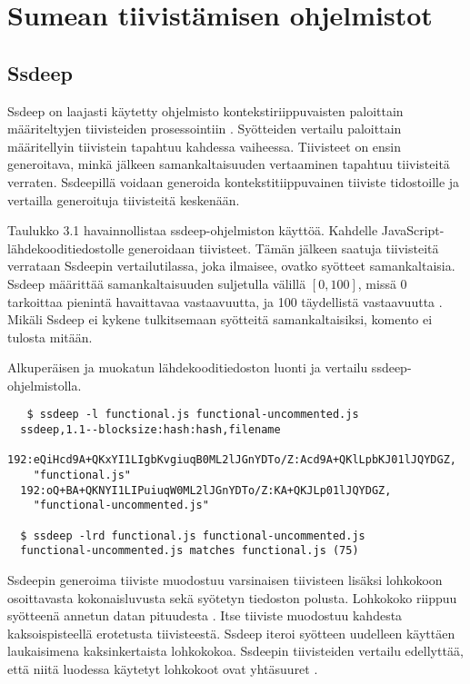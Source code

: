 \chapter{Sumean tiivistämisen ohjelmistot\label{fuzzy-software}}


\section{Ssdeep}

Ssdeep on laajasti käytetty ohjelmisto kontekstiriippuvaisten paloittain
määriteltyjen tiivisteiden prosessointiin \citep{gayoso15}. Syötteiden
vertailu paloittain määritellyin tiivistein tapahtuu kahdessa vaiheessa.
Tiivisteet on ensin generoitava, minkä jälkeen samankaltaisuuden vertaaminen
tapahtuu tiivisteitä verraten. Ssdeepillä voidaan generoida kontekstitiippuvainen tiiviste tidostoille ja vertailla generoituja tiivisteitä keskenään.

Taulukko 3.1 havainnollistaa ssdeep-ohjelmiston käyttöä. Kahdelle
JavaScript-lähdekooditie\-dostolle generoidaan tiivisteet. Tämän
jälkeen saatuja tiivisteitä verrataan Ssdeepin vertailutilassa, joka
ilmaisee, ovatko syötteet samankaltaisia. Ssdeep määrittää samankaltaisuuden
suljetulla välillä $[0, 100]$, missä 0 tarkoittaa pienintä havaittavaa
vastaavuutta, ja 100 täydellistä vastaavuutta \citep{kornblum06}.
Mikäli Ssdeep ei kykene tulkitsemaan syötteitä samankaltaisiksi,
komento ei tulosta mitään.

\begin{table}[h]
  \caption{Alkuperäisen ja muokatun lähdekooditiedoston luonti ja vertailu ssdeep-ohjelmistolla.}
  \begin{verbatim}
   $ ssdeep -l functional.js functional-uncommented.js
  ssdeep,1.1--blocksize:hash:hash,filename
  192:eQiHcd9A+QKxYI1LIgbKvgiuqB0ML2lJGnYDTo/Z:Acd9A+QKlLpbKJ01lJQYDGZ,
    "functional.js"
  192:oQ+BA+QKNYI1LIPuiuqW0ML2lJGnYDTo/Z:KA+QKJLp01lJQYDGZ,
    "functional-uncommented.js"

  $ ssdeep -lrd functional.js functional-uncommented.js
  functional-uncommented.js matches functional.js (75)
  \end{verbatim}
\end{table}

Ssdeepin generoima tiiviste muodostuu varsinaisen tiivisteen lisäksi
lohkokoon osoittavasta kokonaisluvusta sekä syötetyn tiedoston polusta.
Lohkokoko riippuu syötteenä
annetun datan pituudesta \citep{kornblum06}. Itse tiiviste muodostuu kahdesta kaksoispisteellä erotetusta tiivisteestä.
Ssdeep iteroi syötteen uudelleen käyttäen laukaisimena kaksinkertaista
lohkokokoa. Ssdeepin tiivisteiden vertailu edellyttää, että niitä luodessa
käytetyt lohkokoot ovat yhtäsuuret \citep{kornblum06}.
 
